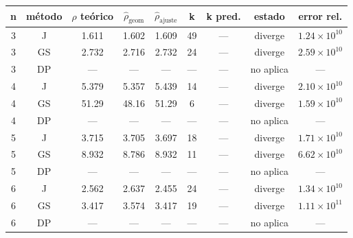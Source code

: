 {\scriptsize
\begin{tabular}{ccccccccc}
\toprule
\rowcolor{Azul1!50}
n & método & $\rho$ teórico & $\hat\rho_{\mathrm{geom}}$ & $\hat\rho_{\mathrm{ajuste}}$ & k & k pred. & estado & error rel. \\
\midrule
3 & J & 1.611 & 1.602 & 1.609 & 49 & --- & diverge & $1.24\times10^{10}$ \\
3 & GS & 2.732 & 2.716 & 2.732 & 24 & --- & diverge & $2.59\times10^{10}$ \\
3 & DP & --- & --- & --- & --- & --- & no aplica & --- \\
4 & J & 5.379 & 5.357 & 5.439 & 14 & --- & diverge & $2.10\times10^{10}$ \\
4 & GS & 51.29 & 48.16 & 51.29 & 6 & --- & diverge & $1.59\times10^{10}$ \\
4 & DP & --- & --- & --- & --- & --- & no aplica & --- \\
5 & J & 3.715 & 3.705 & 3.697 & 18 & --- & diverge & $1.71\times10^{10}$ \\
5 & GS & 8.932 & 8.786 & 8.932 & 11 & --- & diverge & $6.62\times10^{10}$ \\
5 & DP & --- & --- & --- & --- & --- & no aplica & --- \\
6 & J & 2.562 & 2.637 & 2.455 & 24 & --- & diverge & $1.34\times10^{10}$ \\
6 & GS & 3.417 & 3.574 & 3.417 & 19 & --- & diverge & $1.11\times10^{11}$ \\
6 & DP & --- & --- & --- & --- & --- & no aplica & --- \\
\bottomrule
\end{tabular}}
